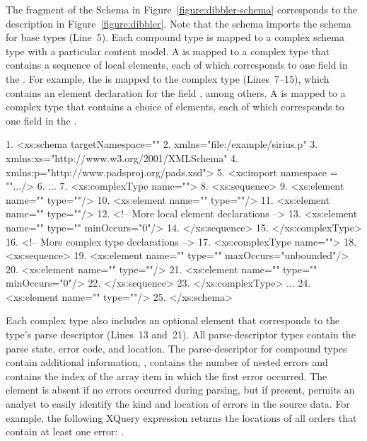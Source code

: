 The fragment of the \Xml{} Schema in Figure~\ref{figure:dibbler-schema}
corresponds to the description in Figure~\ref{figure:dibbler}.  Note
that the schema imports the schema for \pads{} base types (Line~5).
Each compound type is mapped to a complex schema type with a
particular content model.  A  is mapped to a complex type
that contains a sequence of local elements, each of which corresponds
to one field in the .  For example, the 
 is mapped to the complex type
 (Lines~7--15), which contains an element
declaration for the field , among others.  A
 is mapped to a complex type that contains a choice of
elements, each of which corresponds to one field in the .
\begin{figure*}
\begin{small}
\begin{code}
{ 1}. <xs:schema targetNamespace=""
{ 2}.            xmlns="file:/example/sirius.p"
{ 3}.            xmlns:xs="http://www.w3.org/2001/XMLSchema"
{ 4}.            xmlns:p="http://www.padsproj.org/pads.xsd">
{ 5}. <xs:import namespace = "".../>
{ 6}. ...
{ 7}. <xs:complexType name="">
{ 8}.  <xs:sequence>
{ 9}.   <xs:element name=""     type=""/>
{10}.   <xs:element name="" type=""/>
{11}.   <xs:element name=""   type=""/>
{12}.   <!-- More local element declarations -->
{13}.   <xs:element name=""            type="" minOccurs="0"/>
{14}.  </xs:sequence>
{15}. </xs:complexType>
{16}. <!-- More complex type declarations -->
{17}. <xs:complexType name="">
{18}.  <xs:sequence>
{19}.   <xs:element name=""    type="" maxOccurs="unbounded"/>
{20}.   <xs:element name="" type=""/>
{21}.   <xs:element name=""     type="" minOccurs="0"/>
{22}.  </xs:sequence>
{23}. </xs:complexType>
     ...
{24}. <xs:element name="" type=""/>
{25}. </xs:schema>
\end{code}
\end{small}
\caption{Fragment of \Xml{} Schema for \dibbler{} \pads{} description.}
\label{figure:dibbler-schema}
\end{figure*}

Each complex type also includes an optional  element that
corresponds to the type's parse descriptor (Lines~13 and~21).  All
parse-descriptor types contain the parse state, error code, and
location.  The parse-descriptor for compound types contain additional
information, \eg{},  contains the number of nested
errors and  contains the index of the array item in
which the first error occurred.  The  element is absent if no
errors occurred during parsing, but if present, permits an analyst to
easily identify the kind and location of errors in the source data.
For example, the following XQuery expression returns the locations of all
orders that contain at least one error:
.

